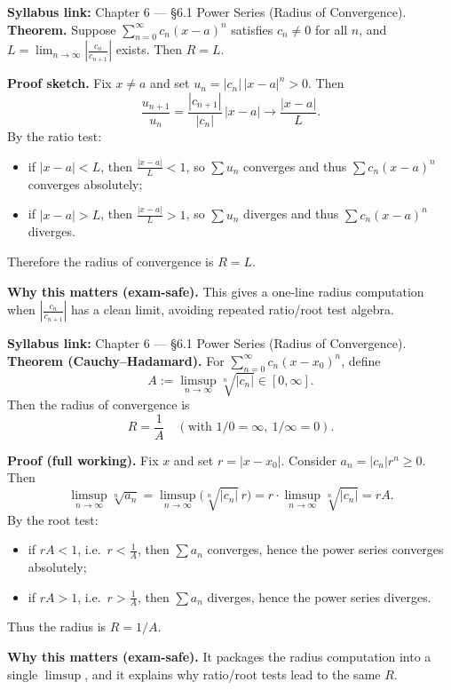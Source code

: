 \begin{extension}[title={Extension (Beyond Syllabus: coefficient-ratio formula for $R$ --- Tutorial~11, Q2)}]
\textbf{Syllabus link:} Chapter 6 --- \S6.1 Power Series (Radius of Convergence).\\
\textbf{Theorem.} Suppose $\sum_{n=0}^{\infty} c_n(x-a)^n$ satisfies $c_n\neq 0$ for all $n$, and $L=\lim_{n\to\infty}\left|\frac{c_n}{c_{n+1}}\right|$ exists. Then $R=L$.

\smallskip
\textbf{Proof sketch.}
Fix $x\neq a$ and set $u_n=|c_n|\,|x-a|^n>0$. Then
\[
\frac{u_{n+1}}{u_n}=\frac{|c_{n+1}|}{|c_n|}\,|x-a|\to\frac{|x-a|}{L}.
\]
By the ratio test:
\begin{itemize}[leftmargin=*]
\item if $|x-a|<L$, then $\frac{|x-a|}{L}<1$, so $\sum u_n$ converges and thus $\sum c_n(x-a)^n$ converges absolutely;
\item if $|x-a|>L$, then $\frac{|x-a|}{L}>1$, so $\sum u_n$ diverges and thus $\sum c_n(x-a)^n$ diverges.
\end{itemize}
Therefore the radius of convergence is $R=L$.

\smallskip
\textbf{Why this matters (exam-safe).} This gives a one-line radius computation when $\left|\frac{c_n}{c_{n+1}}\right|$ has a clean limit, avoiding repeated ratio/root test algebra.
\end{extension}

\begin{extension}[title={Extension (Beyond Syllabus: Cauchy--Hadamard radius formula)}]
\textbf{Syllabus link:} Chapter 6 --- \S6.1 Power Series (Radius of Convergence).\\
\textbf{Theorem (Cauchy--Hadamard).} For $\sum_{n=0}^{\infty} c_n (x-x_0)^n$, define
\[
A:=\limsup_{n\to\infty}\sqrt[n]{|c_n|}\in[0,\infty].
\]
Then the radius of convergence is
\[
R=\frac{1}{A}
\quad (\text{with }1/0=\infty,\ 1/\infty=0).
\]

\smallskip
\textbf{Proof (full working).}
Fix $x$ and set $r=|x-x_0|$. Consider $a_n=|c_n|r^n\ge 0$.
Then
\[
\limsup_{n\to\infty}\sqrt[n]{a_n}
=\limsup_{n\to\infty}\bigl(\sqrt[n]{|c_n|}\,r\bigr)
=r\cdot \limsup_{n\to\infty}\sqrt[n]{|c_n|}
=rA.
\]
By the root test:
\begin{itemize}[leftmargin=*]
\item if $rA<1$, i.e.\ $r<\frac{1}{A}$, then $\sum a_n$ converges, hence the power series converges absolutely;
\item if $rA>1$, i.e.\ $r>\frac{1}{A}$, then $\sum a_n$ diverges, hence the power series diverges.
\end{itemize}
Thus the radius is $R=1/A$.

\smallskip
\textbf{Why this matters (exam-safe).} It packages the radius computation into a single $\limsup$, and it explains why ratio/root tests lead to the same $R$.
\end{extension}

